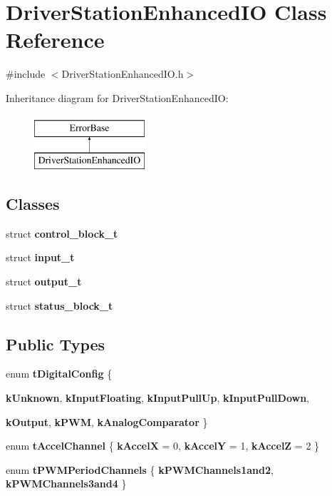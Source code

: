 \hypertarget{classDriverStationEnhancedIO}{
\section{DriverStationEnhancedIO Class Reference}
\label{classDriverStationEnhancedIO}
}


{\ttfamily \#include $<$DriverStationEnhancedIO.h$>$}

Inheritance diagram for DriverStationEnhancedIO:\begin{figure}[H]
\begin{center}
\leavevmode
\includegraphics[height=2.000000cm]{classDriverStationEnhancedIO}
\end{center}
\end{figure}
\subsection*{Classes}
\begin{DoxyCompactItemize}
\item 
struct {\bfseries control\_\-block\_\-t}
\item 
struct {\bfseries input\_\-t}
\item 
struct {\bfseries output\_\-t}
\item 
struct {\bfseries status\_\-block\_\-t}
\end{DoxyCompactItemize}
\subsection*{Public Types}
\begin{DoxyCompactItemize}
\item 
enum {\bfseries tDigitalConfig} \{ \par
{\bfseries kUnknown}, 
{\bfseries kInputFloating}, 
{\bfseries kInputPullUp}, 
{\bfseries kInputPullDown}, 
\par
{\bfseries kOutput}, 
{\bfseries kPWM}, 
{\bfseries kAnalogComparator}
 \}
\item 
enum {\bfseries tAccelChannel} \{ {\bfseries kAccelX} =  0, 
{\bfseries kAccelY} =  1, 
{\bfseries kAccelZ} =  2
 \}
\item 
enum {\bfseries tPWMPeriodChannels} \{ {\bfseries kPWMChannels1and2}, 
{\bfseries kPWMChannels3and4}
 \}
\end{DoxyCompactItemize}

